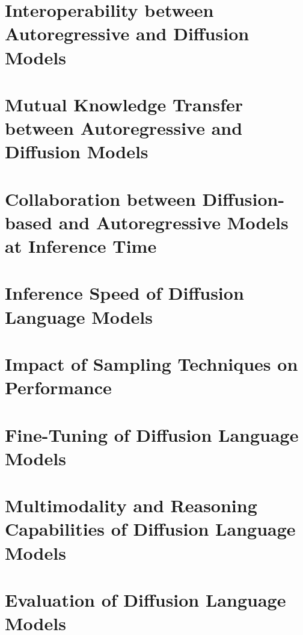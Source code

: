 \documentclass[lettersize,journal]{IEEEtran}
\begin{document}
\section{Interoperability between Autoregressive and Diffusion Models}
\label{sec:interoperability}



\section{Mutual Knowledge Transfer between Autoregressive and Diffusion Models}
\label{sec:distillation}




\section{Collaboration between Diffusion-based and Autoregressive Models at Inference Time}
\label{sec:collaboration}






\section{Inference Speed of Diffusion Language Models}
\label{sec:inference_speed}


\section{Impact of Sampling Techniques on Performance}
\label{sec:sampling}



\section{Fine-Tuning of Diffusion Language Models}
\label{sec:finetuning}


\section{Multimodality and Reasoning Capabilities of Diffusion Language Models}
\label{sec:frontier}




\section{Evaluation of Diffusion Language Models}
\label{sec:evaluation}

\end{document}
